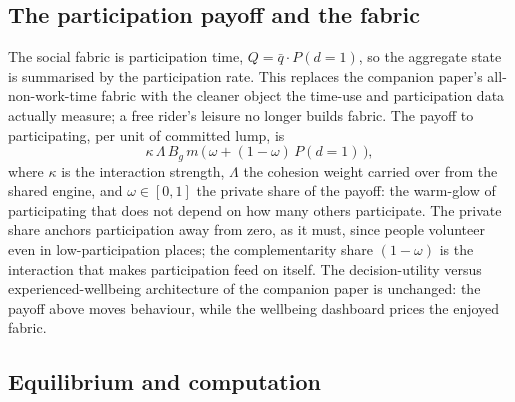 \documentclass[11pt]{article}
\begin{document}
\subsection{The participation payoff and the fabric}

The social fabric is participation time, $Q = \bar{q} \cdot P(d = 1)$, so the aggregate state is summarised by the participation rate. This replaces the companion paper's all-non-work-time fabric with the cleaner object the time-use and participation data actually measure; a free rider's leisure no longer builds fabric. The payoff to participating, per unit of committed lump, is
\begin{equation}
\kappa\,\Lambda\,B_g\,m\,\bigl(\,\omega + (1-\omega)\,P(d=1)\,\bigr),
\end{equation}
where $\kappa$ is the interaction strength, $\Lambda$ the cohesion weight carried over from the shared engine, and $\omega \in [0,1]$ the private share of the payoff: the warm-glow of participating that does not depend on how many others participate. The private share anchors participation away from zero, as it must, since people volunteer even in low-participation places; the complementarity share $(1-\omega)$ is the \citet{brock2001} interaction that makes participation feed on itself. The decision-utility versus experienced-wellbeing architecture of the companion paper is unchanged: the payoff above moves behaviour, while the wellbeing dashboard prices the enjoyed fabric.

\subsection{Equilibrium and computation}
\end{document}
